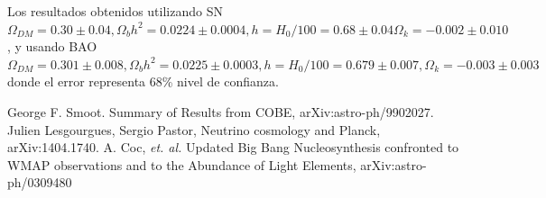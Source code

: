 \documentclass[10.5pt,prb,
               showpacs,            %
               preprintnumbers,     %
               aps,                 %
               prl,          	    %
               letterpaper,             %
               superscriptaddress,      %
               nofootinbib,         %
               tightenlines,        %
               floats,floatfix      %
               ,usenatbib]{revtex4-1}%
\newcommand{\jav}[1]{\textcolor{red}{(jav: #1)}}
\begin{document}
Los resultados obtenidos utilizando SN $\Omega_{DM} =0.30 \pm 0.04, \Omega_b h^2 = 0.0224 \pm 0.0004, h = H_0/100 = 0.68 \pm 0.04
\Omega_k = -0.002 \pm 0.010$, y usando BAO 
$\Omega_{DM} = 0.301 \pm 0.008,   \Omega_b h^2 = 0.0225 \pm 0.0003,  h = H_0/100 = 0.679 \pm 0.007, 
\Omega_k = -0.003 \pm 0.003$ donde el error representa 68\% nivel de confianza.

%





%
\begin{thebibliography}{10}

George F. Smoot. Summary of Results from COBE,  	arXiv:astro-ph/9902027.
 Julien Lesgourgues, Sergio Pastor, Neutrino cosmology and Planck,  	arXiv:1404.1740.
 A. Coc, \textit{et. al.} Updated Big Bang Nucleosynthesis confronted to WMAP observations and to the Abundance of Light Elements,  	arXiv:astro-ph/0309480
\end{thebibliography}
\end{document}
